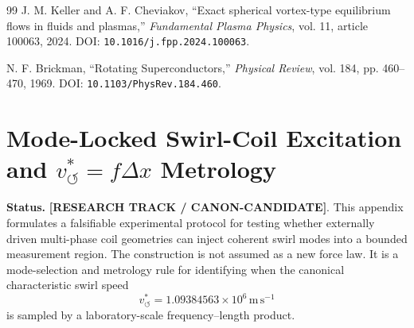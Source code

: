 \begin{thebibliography}{99}
            J. M. Keller and A. F. Cheviakov,
            ``Exact spherical vortex-type equilibrium flows in fluids and plasmas,''
            \textit{Fundamental Plasma Physics},
            vol. 11, article 100063, 2024.
            DOI: \texttt{10.1016/j.fpp.2024.100063}.
            
            N. F. Brickman,
            ``Rotating Superconductors,''
            \textit{Physical Review},
            vol. 184, pp. 460--470, 1969.
            DOI: \texttt{10.1103/PhysRev.184.460}.
        
        \end{thebibliography}
\fi

        
        
        

\providecommand{\swirlarrow}{\mathchoice{\mkern-2mu\scriptstyle\boldsymbol{\circlearrowleft}}{\mkern-2mu\scriptstyle\boldsymbol{\circlearrowleft}}{\mkern-2mu\scriptscriptstyle\boldsymbol{\circlearrowleft}}{\mkern-2mu\scriptscriptstyle\boldsymbol{\circlearrowleft}}}
\providecommand{\vswirl}{\mathbf{v}_{\!\swirlarrow}}
\providecommand{\rhoF}{{\rho_{\!f}}}
\providecommand{\rhoE}{\rho_{\!E}}
\providecommand{\rhoM}{\rho_{\!m}}
\providecommand{\rc}{{r_c}}
\providecommand{\vchar}{v_{\!\boldsymbol{\circlearrowleft}}^{\ast}}
\providecommand{\vnorm}{\vchar}

\section{Mode-Locked Swirl-Coil Excitation and \texorpdfstring{$\vchar=f\Delta x$}{v=f dx} Metrology}
\label{sec:appendix_mode_locked_swirl_coil}

\textbf{Status.} \textbf{[RESEARCH TRACK / CANON-CANDIDATE]}.
This appendix formulates a falsifiable experimental protocol for testing whether externally driven multi-phase coil geometries can inject coherent swirl modes into a bounded measurement region. The construction is not assumed as a new force law. It is a mode-selection and metrology rule for identifying when the canonical characteristic swirl speed
\begin{equation}
\vnorm = 1.09384563\times 10^{6}\,\mathrm{m\,s^{-1}}
\end{equation}
is sampled by a laboratory-scale frequency--length product.

